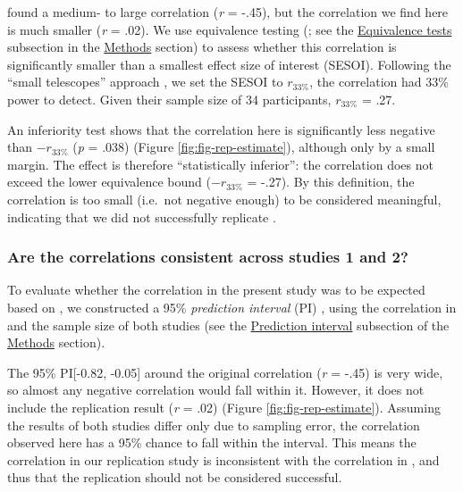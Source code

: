 \documentclass[11pt,]{memoir}
\begin{document}
\textcite{London2015} found a medium- to large correlation (\emph{r} = -.45), but the correlation we find here is much smaller (\emph{r} = .02). We use equivalence testing (\textcite{Lakens2018}; see the \protect\hyperlink{eq}{Equivalence tests} subsection in the \protect\hyperlink{AB_tDCS-methods}{Methods} section) to assess whether this correlation is significantly smaller than a smallest effect size of interest (SESOI). Following the ``small telescopes'' approach \autocite{Simonsohn2015}, we set the SESOI to \(r_{33\%}\), the correlation \textcite{London2015} had 33\% power to detect. Given their sample size of 34 participants, \(r_{33\%}\) = .27.

An inferiority test shows that the correlation here is significantly less negative than \(-r_{33\%}\) (\emph{p} = .038) (Figure \ref{fig:fig-rep-estimate}), although only by a small margin. The effect is therefore ``statistically inferior'': the correlation does not exceed the lower equivalence bound (\(-r_{33\%}\) = -.27). By this definition, the correlation is too small (i.e.~not negative enough) to be considered meaningful, indicating that we did not successfully replicate \textcite{London2015}.

\hypertarget{are-the-correlations-consistent-across-studies-1-and-2}{%
\subsubsection{Are the correlations consistent across studies 1 and 2?}\label{are-the-correlations-consistent-across-studies-1-and-2}}

To evaluate whether the correlation in the present study was to be expected based on \textcite{London2015}, we constructed a 95\% \emph{prediction interval} (PI) \autocite{Spence2016}, using the correlation in \textcite{London2015} and the sample size of both studies (see the \protect\hyperlink{pi}{Prediction interval} subsection of the \protect\hyperlink{AB_tDCS-methods}{Methods} section).

The 95\% PI{[}-0.82, -0.05{]} around the original correlation (\emph{r} = -.45) is very wide, so almost any negative correlation would fall within it. However, it does not include the replication result (\emph{r} = .02) (Figure \ref{fig:fig-rep-estimate}). Assuming the results of both studies differ only due to sampling error, the correlation observed here has a 95\% chance to fall within the interval. This means the correlation in our replication study is inconsistent with the correlation in \textcite{London2015}, and thus that the replication should not be considered successful.
\end{document}
